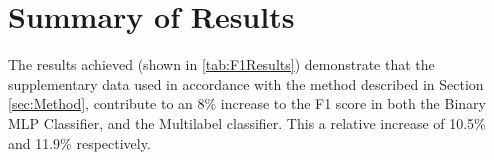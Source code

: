 \documentclass{UoNMCHA}
\numberwithin{equation}{section}
\begin{document}


% 


\section{Summary of Results}
The results achieved (shown in \ref{tab:F1Results}) demonstrate that the supplementary data used in accordance with the method described in Section \ref{sec:Method}, contribute to an 8\% increase to the F1 score in both the Binary MLP Classifier, and the Multilabel classifier. This a relative increase of 10.5\% and 11.9\% respectively. 
\end{document}
